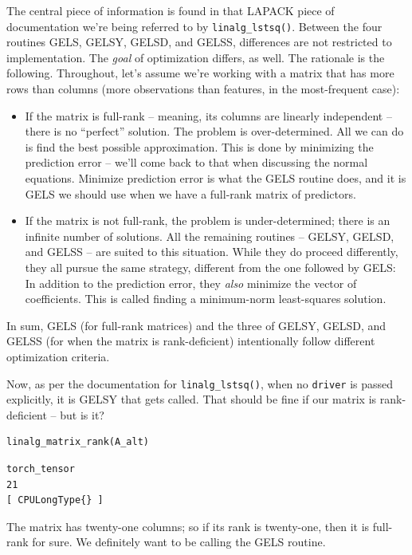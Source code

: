 \documentclass[
  letterpaper,
]{krantz}
\begin{document}
The central piece of information is found in that LAPACK
piece of documentation we're being referred to by
\texttt{linalg\_lstsq()}. Between the four routines GELS, GELSY, GELSD,
and GELSS, differences are not restricted to implementation. The
\emph{goal} of optimization differs, as well. The rationale is the
following. Throughout, let's assume we're working with a matrix that has
more rows than columns (more observations than features, in the
most-frequent case):

\begin{itemize}
\item
  If the matrix is full-rank -- meaning, its columns are linearly
  independent -- there is no ``perfect'' solution. The problem is
  over-determined. All we can do is find the best possible
  approximation. This is done by minimizing the prediction error --
  we'll come back to that when discussing the normal equations. Minimize
  prediction error is what the GELS routine does, and it is GELS we
  should use when we have a full-rank matrix of predictors.
\item
  If the matrix is not full-rank, the problem is under-determined; there
  is an infinite number of solutions. All the remaining routines --
  GELSY, GELSD, and GELSS -- are suited to this situation. While they do
  proceed differently, they all pursue the same strategy, different from
  the one followed by GELS: In addition to the prediction error, they
  \emph{also} minimize the vector of coefficients. This is called
  finding a minimum-norm least-squares solution.
\end{itemize}

In sum, GELS (for full-rank matrices) and the three of GELSY, GELSD, and
GELSS (for when the matrix is rank-deficient) intentionally follow
different optimization criteria.

Now, as per the documentation for \texttt{linalg\_lstsq()}, when no
\texttt{driver} is passed explicitly, it is GELSY that gets called. That
should be fine if our matrix is rank-deficient -- but is it?

\begin{verbatim}
linalg_matrix_rank(A_alt)
\end{verbatim}

\begin{verbatim}
torch_tensor
21
[ CPULongType{} ]
\end{verbatim}

The matrix has twenty-one columns; so if its rank is twenty-one, then it
is full-rank for sure. We definitely want to be calling the GELS
routine.
\end{document}

